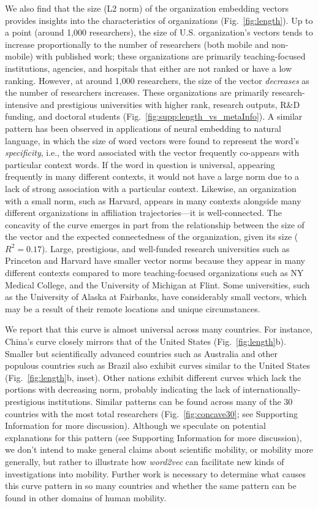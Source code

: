 \documentclass[12pt]{article} %
\def\SI{Supporting Information}
\begin{document}
We also find that the size (L2 norm) of the organization embedding vectors provides insights into the characteristics of organizations (Fig.~\ref{fig:length}).
Up to a point (around 1,000 researchers), the size of U.S. organization's vectors tends to increase proportionally to the number of researchers (both mobile and non-mobile) with published work;
these organizations are primarily teaching-focused institutions, agencies, and hospitals that either are not ranked or have a low ranking.
However, at around 1,000 researchers, the size of the vector \emph{decreases} as the number of researchers increases.
These organizations are primarily research-intensive and prestigious universities with higher rank, research outputs, R\&D funding, and doctoral students (Fig.~\ref{fig:supp:length_vs_metaInfo}).
A similar pattern has been observed in applications of neural embedding to natural language, in which the size of word vectors were found to represent the word's \emph{specificity}, i.e., the word associated with the vector frequently co-appears with particular context words\autocite{schakel2015measuring}.
If the word in question is universal, appearing frequently in many different contexts, it would not have a large norm due to a lack of strong association with a particular context.
Likewise, an organization with a small norm, such as Harvard, appears in many contexts alongside many different organizations in affiliation trajectories---it is well-connected.
The concavity of the curve emerges in part from the relationship between the size of the vector and the expected connectedness of the organization, given its size ($R^{2} = 0.17$).
Large, prestigious, and well-funded research universities such as Princeton and Harvard have smaller vector norms because they appear in many different contexts compared to more teaching-focused organizations such as NY Medical College, and the University of Michigan at Flint.
Some universities, such as the University of Alaska at Fairbanks, have considerably small vectors, which may be a result of their remote locations and unique circumstances.


We report that this curve is almost universal across many countries.
For instance, China's curve closely mirrors that of the United States (Fig.~\ref{fig:length}b).
Smaller but scientifically advanced countries such as Australia and other populous countries such as Brazil also exhibit curves similar to the United States (Fig.~\ref{fig:length}b, inset).
Other nations exhibit different curves which lack the portions with decreasing norm, probably indicating the lack of internationally-prestigious institutions.
Similar patterns can be found across many of the 30 countries with the most total researchers (Fig.~\ref{fig:concave30}; see \SI{} for more discussion).  Although we speculate on potential explanations for this pattern (see \SI{} for more discussion), we don't intend to make general claims about scientific mobility, or mobility more generally, but rather to illustrate how \textit{word2vec} can facilitate new kinds of investigations into mobility.
Further work is necessary to determine what causes this curve pattern in so many countries and whether the same pattern can be found in other domains of human mobility.
\end{document}

